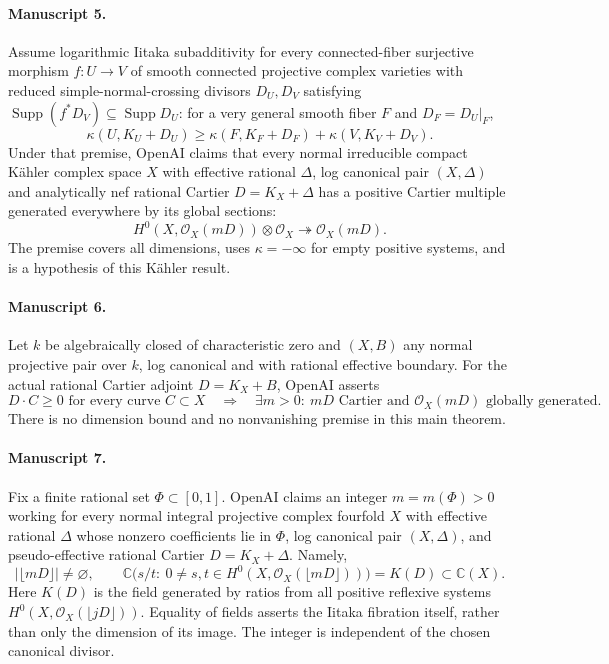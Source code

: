 \documentclass[11pt]{article}
\begin{document}
\paragraph{Manuscript 5.}
Assume logarithmic Iitaka subadditivity for every connected-fiber surjective morphism $f:U\to V$ of smooth connected projective complex varieties with reduced simple-normal-crossing divisors $D_U,D_V$ satisfying $\operatorname{Supp}(f^*D_V)\subseteq\operatorname{Supp}D_U$: for a very general smooth fiber $F$ and $D_F=D_U|_F$,
\[
\kappa(U,K_U+D_U)\ge\kappa(F,K_F+D_F)+\kappa(V,K_V+D_V).
\]
Under that premise, OpenAI claims that every normal irreducible compact Kähler complex space $X$ with effective rational $\Delta$, log canonical pair $(X,\Delta)$ and analytically nef rational Cartier $D=K_X+\Delta$ has a positive Cartier multiple generated everywhere by its global sections:
\[
H^0(X,\mathcal O_X(mD))\otimes\mathcal O_X\twoheadrightarrow\mathcal O_X(mD).
\]
The premise covers all dimensions, uses $\kappa=-\infty$ for empty positive systems, and is a hypothesis of this Kähler result.

\paragraph{Manuscript 6.}
Let $k$ be algebraically closed of characteristic zero and $(X,B)$ any normal projective pair over $k$, log canonical and with rational effective boundary. For the actual rational Cartier adjoint $D=K_X+B$, OpenAI asserts
\[
D\cdot C\ge0\text{ for every curve }C\subset X
\quad\Longrightarrow\quad
\exists m>0:\ mD\text{ Cartier and }\mathcal O_X(mD)\text{ globally generated}.
\]
There is no dimension bound and no nonvanishing premise in this main theorem.

\paragraph{Manuscript 7.}
Fix a finite rational set $\Phi\subset[0,1]$. OpenAI claims an integer $m=m(\Phi)>0$ working for every normal integral projective complex fourfold $X$ with effective rational $\Delta$ whose nonzero coefficients lie in $\Phi$, log canonical pair $(X,\Delta)$, and pseudo-effective rational Cartier $D=K_X+\Delta$. Namely,
\[
|\lfloor mD\rfloor|\ne\varnothing,\qquad
\mathbb C\bigl(s/t:\ 0\ne s,t\in H^0(X,\mathcal O_X(\lfloor mD\rfloor))\bigr)=K(D)\subset\mathbb C(X).
\]
Here $K(D)$ is the field generated by ratios from all positive reflexive systems $H^0(X,\mathcal O_X(\lfloor jD\rfloor))$. Equality of fields asserts the Iitaka fibration itself, rather than only the dimension of its image. The integer is independent of the chosen canonical divisor.
\end{document}

